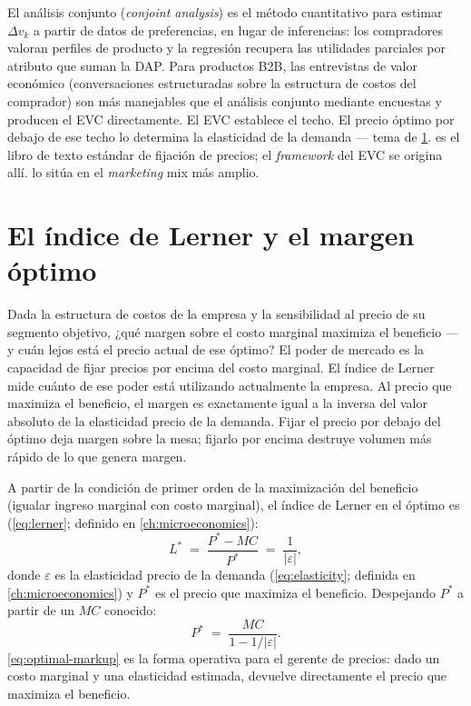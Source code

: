 El análisis conjunto (\emph{conjoint analysis}) es el método cuantitativo para estimar \(\Delta v_k\) a partir de datos de preferencias, en lugar de inferencias: los compradores valoran perfiles de producto y la regresión recupera las utilidades parciales por atributo que suman la DAP. Para productos B2B, las entrevistas de valor económico (conversaciones estructuradas sobre la estructura de costos del comprador) son más manejables que el análisis conjunto mediante encuestas y producen el EVC directamente. El EVC establece el techo. El precio óptimo por debajo de ese techo lo determina la elasticidad de la demanda --- tema de \cref{sec:optimal-markup}. \textcite{nagle2023strategy} es el libro de texto estándar de fijación de precios; el \emph{framework} del EVC se origina allí. \textcite{kotler2021} lo sitúa en el \emph{marketing} mix más amplio.

\section{El índice de Lerner y el margen óptimo}\label{sec:optimal-markup}

Dada la estructura de costos de la empresa y la sensibilidad al precio de su segmento objetivo, ¿qué margen sobre el costo marginal maximiza el beneficio --- y cuán lejos está el precio actual de ese óptimo? El poder de mercado es la capacidad de fijar precios por encima del costo marginal. El índice de Lerner mide cuánto de ese poder está utilizando actualmente la empresa. Al precio que maximiza el beneficio, el margen es exactamente igual a la inversa del valor absoluto de la elasticidad precio de la demanda. Fijar el precio por debajo del óptimo deja margen sobre la mesa; fijarlo por encima destruye volumen más rápido de lo que genera margen.

A partir de la condición de primer orden de la maximización del beneficio (igualar ingreso marginal con costo marginal), el índice de Lerner en el óptimo es (\cref{eq:lerner}; definido en \cref{ch:microeconomics}):
\begin{equation*}
  L^* \;=\; \frac{P^* - MC}{P^*} \;=\; \frac{1}{|\varepsilon|} ,
\end{equation*}
donde \(\varepsilon\) es la elasticidad precio de la demanda (\cref{eq:elasticity}; definida en \cref{ch:microeconomics}) y \(P^*\) es el precio que maximiza el beneficio. Despejando \(P^*\) a partir de un \(MC\) conocido:
\begin{equation}\label{eq:optimal-markup}
  P^* \;=\; \frac{MC}{1 - 1/|\varepsilon|} .
\end{equation}
\cref{eq:optimal-markup} es la forma operativa para el gerente de precios: dado un costo marginal y una elasticidad estimada, devuelve directamente el precio que maximiza el beneficio.

